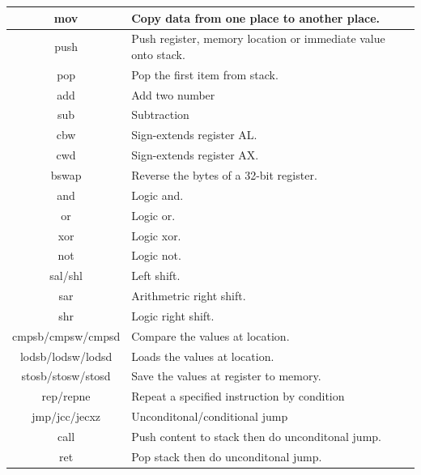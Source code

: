 \documentclass[12pt]{extarticle}
\begin{document}
        \begin{table}[h!]
            \centering
            \begin{tabular}{||c | p{9cm}||} 
             \hline
             mov & Copy data from one place to another place. \\ [0.5ex] 
             \hline
             push & Push register, memory location or immediate value onto stack.  \\ 
             \hline
             pop & Pop the first item from stack. \\
             \hline
             add & Add two number \\
             \hline
             sub &  Subtraction \\
             \hline
             cbw & Sign-extends register AL. \\
             \hline
             cwd & Sign-extends register AX. \\
             \hline
             bswap & Reverse the bytes of a 32-bit register. \\
             \hline
             and & Logic and. \\
             \hline
             or & Logic or. \\
             \hline
             xor & Logic xor. \\
             \hline
             not & Logic not. \\
             \hline
             sal/shl & Left shift. \\
             \hline
             sar & Arithmetric right shift. \\
             \hline
             shr & Logic right shift. \\
             \hline
             cmpsb/cmpsw/cmpsd & Compare the values at location. \\
             \hline
             lodsb/lodsw/lodsd & Loads the values at location. \\
             \hline
             stosb/stosw/stosd & Save the values at register to memory. \\
             \hline
             rep/repne & Repeat a specified instruction by condition \\
             \hline
             jmp/jcc/jecxz & Unconditonal/conditional jump \\
             \hline
             call & Push content to stack then do unconditonal jump.\\
             \hline
             ret & Pop stack then do unconditonal jump.\\

\end{tabular}
\end{table}
\end{document}
